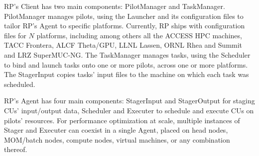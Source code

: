 \documentclass[preprint,12pt, a4paper]{elsarticle}
\begin{document}

RP's Client has two main components: PilotManager and TaskManager. PilotManager
manages pilots, using the Launcher and its configuration files to tailor RP's
Agent to specific platforms. Currently, RP ships with configuration files for
$N$ platforms, including among others all the ACCESS HPC
machines, TACC Frontera, ALCF Theta/GPU, LLNL Lassen, ORNL Rhea and Summit and
LRZ SuperMUC-NG. The TaskManager manages tasks, using the Scheduler to bind and
launch tasks onto one or more pilots, across one or more platforms. The
StagerInput copies tasks' input files to the machine on which each task was
scheduled.


RP's Agent has four main components: StagerInput and StagerOutput for staging CUs'
input/output data, Scheduler and Executer to schedule and execute CUs on
pilots' resources. For performance optimization at scale, multiple instances
of Stager and Executer can coexist in a single Agent, placed on head nodes,
MOM/batch nodes, compute nodes, virtual machines, or any combination thereof.

\end{document}
